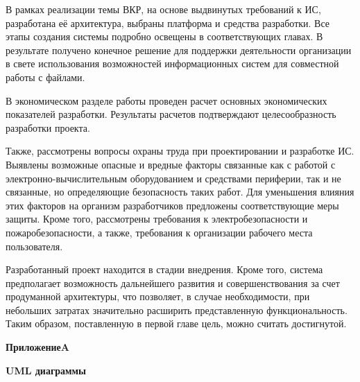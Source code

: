 \documentclass[utf8,usehyperref,12pt]{G7-32}
\makeatletter
\renewcommand\appendixname{Приложение}
\def\redeflchapter{\def\l@chapter{\@dottedtocline{1}{3.0em}{7.8em}}}
\renewcommand\appendix{\par
\setcounter{chapter}{0}%
\setcounter{section}{0}%
\def\@chapapp{\appendixname}%
\addtocontents{toc}{\protect\redeflchapter}
\def\thechapter{\appendixname\hspace{0.2cm}\@Alph\c@chapter}

}
\makeatother
\begin{document}
В рамках реализации темы ВКР, на основе выдвинутых требований к ИС, разработана её архитектура, выбраны платформа и средства разработки. Все этапы создания системы подробно освещены в соответствующих главах. В результате получено конечное решение для поддержки деятельности организации в свете использования возможностей информационных систем для совместной работы с файлами.

В экономическом разделе работы проведен расчет основных экономических показателей разработки. Результаты расчетов подтверждают целесообразность разработки проекта.

Также, рассмотрены вопросы охраны труда при проектировании и разработке ИС. Выявлены возможные опасные и вредные факторы связанные как с работой с электронно-вычислительным оборудованием и средствами периферии, так и не связанные, но определяющие безопасность таких работ. Для уменьшения влияния этих факторов на организм разработчиков предложены соответствующие меры защиты. Кроме того, рассмотрены требования к  электробезопасности и пожаробезопасности, а также,  требования к организации рабочего места пользователя.

Разработанный проект находится в стадии внедрения. Кроме того, система предполагает возможность дальнейшего развития и совершенствования за счет продуманной архитектуры, что позволяет, в случае необходимости, при небольших затратах значительно расширить представленную функциональность. Таким образом, поставленную в первой главе цель, можно считать достигнутой.




\appendix


\renewcommand\chapter[1]{%
  \pagebreak
  \vspace*{10 pt}%
  {\parindent=0pt
   \center \normalfont\huge\bfseries
    \thechapter A \par %
    \vspace{10 pt} %
    \normalfont\bfseries #1\par %
    \pagebreak     %
    \vspace{10 pt}   %
  }%
}

\chapter{UML диаграммы}\label{appendix_a}
\end{document}
